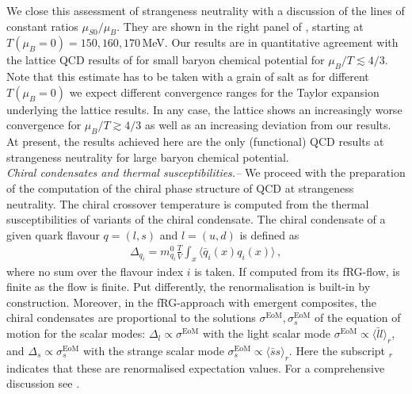 \documentclass[reprint,twocolumn,superscriptaddress,preprintnumbers,amsmath,amssymb,aps,prd,floatfix]{revtex4-2}
\begin{document}
We close this assessment of strangeness neutrality with a discussion of the lines of constant ratios $\mu_{S0}/\mu_{B}$. They are shown in the right panel of , starting at $T(\mu_B=0)=150,160,170$\,MeV. Our results are in quantitative agreement with the lattice QCD results of \cite{Borsanyi:2025kiv} for small baryon chemical potential for $\mu_B/T \lesssim 4/3$. Note that this estimate has to be taken with a grain of salt as for different $T(\mu_B=0)$ we expect different convergence ranges for the Taylor expansion underlying the lattice results. In any case, the lattice shows an increasingly worse convergence for $\mu_B/T \gtrsim 4/3$ as well as an increasing deviation from our results. At present, the results achieved here are the only (functional) QCD results at strangeness neutrality for large baryon chemical potential.   \\[-1.5ex] 



\emph{Chiral condensates and thermal susceptibilities.--} 
%
We proceed with the preparation of the computation of the chiral phase structure of QCD at strangeness neutrality. The chiral crossover temperature is computed from the thermal susceptibilities of variants of the chiral condensate. The chiral condensate of a given quark flavour $q=(l,s)$ and $l=(u,d)$ is defined as
%
\begin{align}
\Delta_{q_i}=m_{q_i}^0\frac{T}{V}\int_x\langle {\bar q}_i (x)q_i(x)\rangle\,,
\label{eq:ChiralCondensate}
\end{align}
%
where no sum over the flavour index $i$ is taken. If computed from its fRG-flow,  is finite as the flow is finite. Put differently, the renormalisation is built-in by construction. Moreover, in the fRG-approach with emergent composites, the chiral condensates are proportional to the solutions $\sigma^\textrm{EoM}, \sigma_s^\textrm{EoM}$ of the equation of motion for the scalar modes: $\Delta_{l} \propto \sigma^\textrm{EoM}$ with the 
light scalar mode $\sigma^\textrm{EoM} \propto \langle \bar l l\rangle_r $, and  $\Delta_{s} \propto \sigma^\textrm{EoM}_s$ with the strange scalar mode $\sigma^\textrm{EoM}_s \propto \langle \bar s s\rangle_r $. Here the subscript ${}_r$ indicates that these are renormalised expectation values. For a comprehensive discussion see \cite{Fu:2019hdw}. 
\end{document}
